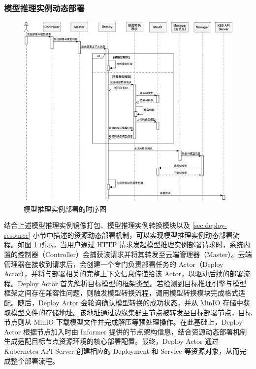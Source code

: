\subsubsection{模型推理实例动态部署}

\begin{figure}[ht]
  \centering
  \includegraphics[width=\linewidth]{pics/4-13deployai.png}
  \caption{模型推理实例部署的时序图}
  \label{fig:4-13deployai}
\end{figure}

结合上述模型推理实例镜像打包、模型推理实例转换模块以及 \ref{sec:deploy-resource} 小节中描述的资源动态部署机制，可以实现模型推理实例动态部署流程。如图 \ref{fig:4-13deployai} 所示，当用户通过 HTTP 请求发起模型推理实例部署请求时，系统内置的控制器（Controller）会捕获该请求并将其转发至云端管理器（Master）。云端管理器在接收到请求后，会创建一个专门负责部署任务的 Actor（Deploy Actor），并将与部署相关的完整上下文信息传递给该 Actor，以驱动后续的部署流程。Deploy Actor 首先解析目标模型的框架类型。若检测到目标推理引擎与模型框架之间存在兼容性问题，则触发模型转换流程，调用模型转换模块完成格式适配。随后，Deploy Actor 会轮询确认模型转换的成功状态，并从 MinIO 存储中获取模型文件的存储地址。该地址通过边缘集群主节点被转发至目标部署节点，目标节点则从 MinIO 下载模型文件并完成解压等预处理操作。在此基础上，Deploy Actor 根据节点加入时由 Informer 提供的节点架构信息，结合资源动态部署机制生成适配目标节点资源环境的核心部署配置。最终，Deploy Actor 通过 Kubernetes API Server 创建相应的 Deployment 和 Service 等资源对象，从而完成整个部署流程。

